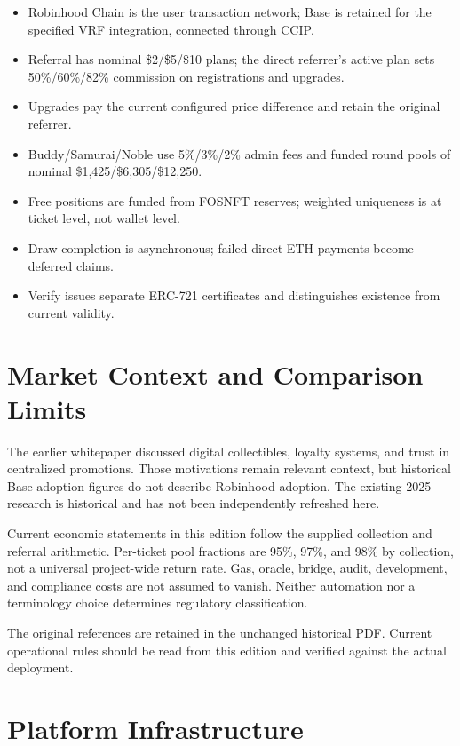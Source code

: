 \documentclass[
  10pt,
  letterpaper,
]{article}
\providecommand{\tightlist}{%
  \setlength{\itemsep}{0pt}\setlength{\parskip}{0pt}}
\begin{document}
\begin{itemize}
\tightlist
\item
  Robinhood Chain is the user transaction network; Base is retained for
  the specified VRF integration, connected through CCIP.
\item
  Referral has nominal \$2/\$5/\$10 plans; the direct referrer's active
  plan sets 50\%/60\%/82\% commission on registrations and upgrades.
\item
  Upgrades pay the current configured price difference and retain the
  original referrer.
\item
  Buddy/Samurai/Noble use 5\%/3\%/2\% admin fees and funded round pools
  of nominal \$1,425/\$6,305/\$12,250.
\item
  Free positions are funded from FOSNFT reserves; weighted uniqueness is
  at ticket level, not wallet level.
\item
  Draw completion is asynchronous; failed direct ETH payments become
  deferred claims.
\item
  Verify issues separate ERC-721 certificates and distinguishes
  existence from current validity.
\end{itemize}

\section{Market Context and Comparison
Limits}\label{market-context-and-comparison-limits}

The earlier whitepaper discussed digital collectibles, loyalty systems,
and trust in centralized promotions. Those motivations remain relevant
context, but historical Base adoption figures do not describe Robinhood
adoption. The existing 2025 research is historical and has not been
independently refreshed here.

Current economic statements in this edition follow the supplied
collection and referral arithmetic. Per-ticket pool fractions are 95\%,
97\%, and 98\% by collection, not a universal project-wide return rate.
Gas, oracle, bridge, audit, development, and compliance costs are not
assumed to vanish. Neither automation nor a terminology choice
determines regulatory classification.

The original references are retained in the unchanged historical PDF.
Current operational rules should be read from this edition and verified
against the actual deployment.

\section{Platform Infrastructure}\label{platform-infrastructure}
\end{document}
